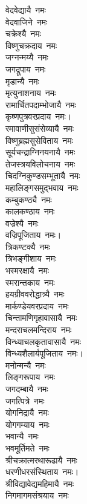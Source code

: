 \begin{multicols}{2}
\begin{flushleft}
वेदवेद्यायै~नमः\\
वेदवाजिने~नमः\\
चक्रेश्यै~नमः\\
विष्णुचक्रदाय~नमः\\
जग्नन्मय्यै~नमः\\
जगद्रूपाय~नमः\\
मृडान्यै~नमः\\
मृत्युनाशनाय~नमः\\
रामार्चितपदाम्भोजायै~नमः\\
कृष्णपुत्रवरप्रदाय~नमः।\hfill{}\\
रमावाणीसुसंसेव्यायै~नमः\\
विष्णुब्रह्मसुसेविताय~नमः\\
सूर्यचन्द्राग्निनयनायै~नमः\\
तेजस्त्रयविलोचनाय~नमः\\
चिदग्निकुण्डसम्भूतायै~नमः\\
महालिङ्गसमुद्भवाय~नमः\\
कम्बुकण्ठ्यै~नमः\\
कालकण्ठाय~नमः\\
वज्रेश्यै~नमः\\
वज्रिपूजिताय~नमः।\hfill{}\\
त्रिकण्टक्यै~नमः\\
त्रिभङ्गीशाय~नमः\\
भस्मरक्षायै~नमः\\
स्मरान्तकाय~नमः\\
हयग्रीववरोद्धात्र्यै~नमः\\
मार्कण्डेयवरप्रदाय~नमः\\
चिन्तामणिगृहावासायै~नमः\\
मन्दराचलमन्दिराय~नमः\\
विन्ध्याचलकृतावासायै~नमः\\
विन्ध्यशैलार्यपूजिताय~नमः।\hfill{}\\
मनोन्मन्यै~नमः\\
लिङ्गरूपाय~नमः\\
जगदम्बायै~नमः\\
जगत्पित्रे~नमः\\
योगनिद्रायै~नमः\\
योगगम्याय~नमः\\
भवान्यै~नमः\\
भवमूर्तिमते~नमः\\
श्रीचक्रात्मरथारूढायै~नमः\\
धरणीधरसंस्थिताय~नमः।\hfill{}\\
श्रीविद्यावेद्यमहिमायै~नमः\\
निगमागमसंश्रयाय~नमः\\

\end{flushleft}
\end{multicols}

